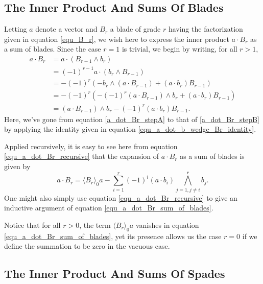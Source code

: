 \documentclass{birkjour}
\theoremstyle{definition}
\theoremstyle{remark}
\numberwithin{equation}{section}
\begin{document}
\subsection{The Inner Product And Sums Of Blades}

Letting $a$ denote a vector and $B_r$ a blade of grade $r$ having the factorization
given in equation \eqref{equ_B_r}, we wish here to express the inner product $a\cdot B_r$ as a sum of blades.
Since the case $r=1$ is trivial, we begin by writing, for all $r>1$,
\begin{align}
a\cdot B_r
 &= a\cdot(B_{r-1}\wedge b_r)\nonumber \\
 &= (-1)^{r-1}a\cdot(b_r\wedge B_{r-1})\label{a_dot_Br_stepA} \\
 &= -(-1)^r\left(-b_r\wedge(a\cdot B_{r-1})+(a\cdot b_r)B_{r-1}\right)\label{a_dot_Br_stepB} \\
 &= -(-1)^r\left(-(-1)^r(a\cdot B_{r-1})\wedge b_r+(a\cdot b_r)B_{r-1}\right)\nonumber \\
 &= (a\cdot B_{r-1})\wedge b_r - (-1)^r(a\cdot b_r)B_{r-1}.\label{equ_a_dot_Br_recursive}
\end{align}
Here, we've gone from equation \eqref{a_dot_Br_stepA} to that of \eqref{a_dot_Br_stepB} by
applying the identity given in equation \eqref{equ_a_dot_b_wedge_Br_identity}.

Applied recursively, it is easy to see here from equation \eqref{equ_a_dot_Br_recursive} that the expansion of
$a\cdot B_r$ as a sum of blades is given by
\begin{equation}\label{equ_a_dot_Br_sum_of_blades}
a\cdot B_r = \langle B_r\rangle_0a - \sum_{i=1}^r(-1)^i(a\cdot b_i)\bigwedge_{j=1,j\neq i}^r b_j.
\end{equation}
One might also simply use equation \eqref{equ_a_dot_Br_recursive} to give an inductive
argument of equation \eqref{equ_a_dot_Br_sum_of_blades}.

Notice that for all $r>0$, the term $\langle B_r\rangle_0a$ vanishes in equation \eqref{equ_a_dot_Br_sum_of_blades},
yet its presence allows us the case $r=0$ if we define the summation to be zero in the vacuous case.


\subsection{The Inner Product And Sums Of Spades}
\end{document}
